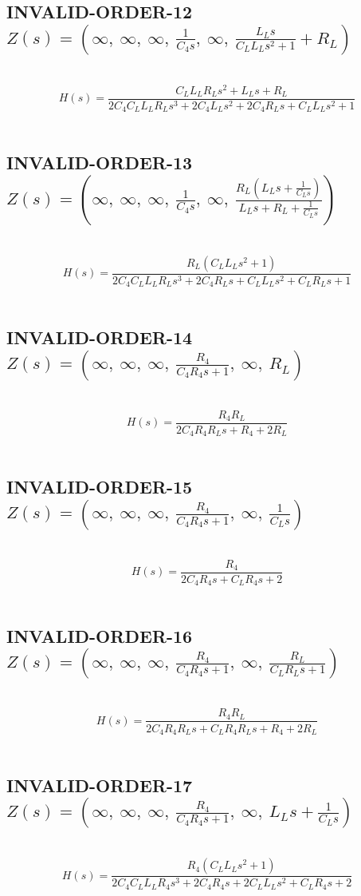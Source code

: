 \documentclass{article}
\begin{document}
\subsection{INVALID-ORDER-12 $Z(s) = \left( \infty, \  \infty, \  \infty, \  \frac{1}{C_{4} s}, \  \infty, \  \frac{L_{L} s}{C_{L} L_{L} s^{2} + 1} + R_{L}\right)$ } \ 
\textbf{\[H(s) = \frac{C_{L} L_{L} R_{L} s^{2} + L_{L} s + R_{L}}{2 C_{4} C_{L} L_{L} R_{L} s^{3} + 2 C_{4} L_{L} s^{2} + 2 C_{4} R_{L} s + C_{L} L_{L} s^{2} + 1}\] } \ 
\subsection{INVALID-ORDER-13 $Z(s) = \left( \infty, \  \infty, \  \infty, \  \frac{1}{C_{4} s}, \  \infty, \  \frac{R_{L} \left(L_{L} s + \frac{1}{C_{L} s}\right)}{L_{L} s + R_{L} + \frac{1}{C_{L} s}}\right)$ } \ 
\textbf{\[H(s) = \frac{R_{L} \left(C_{L} L_{L} s^{2} + 1\right)}{2 C_{4} C_{L} L_{L} R_{L} s^{3} + 2 C_{4} R_{L} s + C_{L} L_{L} s^{2} + C_{L} R_{L} s + 1}\] } \ 
\subsection{INVALID-ORDER-14 $Z(s) = \left( \infty, \  \infty, \  \infty, \  \frac{R_{4}}{C_{4} R_{4} s + 1}, \  \infty, \  R_{L}\right)$ } \ 
\textbf{\[H(s) = \frac{R_{4} R_{L}}{2 C_{4} R_{4} R_{L} s + R_{4} + 2 R_{L}}\] } \ 
\subsection{INVALID-ORDER-15 $Z(s) = \left( \infty, \  \infty, \  \infty, \  \frac{R_{4}}{C_{4} R_{4} s + 1}, \  \infty, \  \frac{1}{C_{L} s}\right)$ } \ 
\textbf{\[H(s) = \frac{R_{4}}{2 C_{4} R_{4} s + C_{L} R_{4} s + 2}\] } \ 
\subsection{INVALID-ORDER-16 $Z(s) = \left( \infty, \  \infty, \  \infty, \  \frac{R_{4}}{C_{4} R_{4} s + 1}, \  \infty, \  \frac{R_{L}}{C_{L} R_{L} s + 1}\right)$ } \ 
\textbf{\[H(s) = \frac{R_{4} R_{L}}{2 C_{4} R_{4} R_{L} s + C_{L} R_{4} R_{L} s + R_{4} + 2 R_{L}}\] } \ 
\subsection{INVALID-ORDER-17 $Z(s) = \left( \infty, \  \infty, \  \infty, \  \frac{R_{4}}{C_{4} R_{4} s + 1}, \  \infty, \  L_{L} s + \frac{1}{C_{L} s}\right)$ } \ 
\textbf{\[H(s) = \frac{R_{4} \left(C_{L} L_{L} s^{2} + 1\right)}{2 C_{4} C_{L} L_{L} R_{4} s^{3} + 2 C_{4} R_{4} s + 2 C_{L} L_{L} s^{2} + C_{L} R_{4} s + 2}\] } \ 
\end{document}
